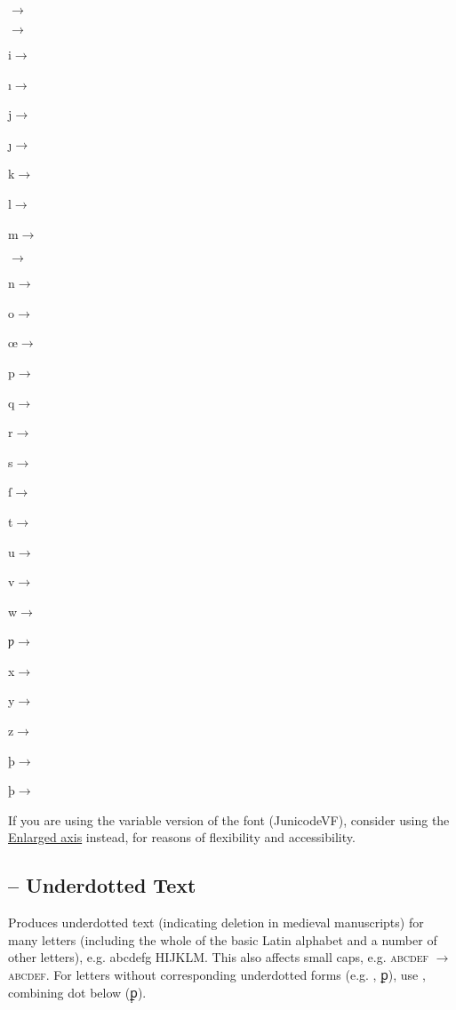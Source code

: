 \begin{multicols}{5}
$\rightarrow $

$\rightarrow $

i$\rightarrow $

ı$\rightarrow $

j$\rightarrow $

ȷ$\rightarrow $

k$\rightarrow $

l$\rightarrow $

m$\rightarrow $

$\rightarrow $

n$\rightarrow $

o$\rightarrow $

œ$\rightarrow $

p$\rightarrow $

q$\rightarrow $

r$\rightarrow $

s$\rightarrow $

ſ$\rightarrow $

t$\rightarrow $

u$\rightarrow $

v$\rightarrow $

w$\rightarrow $

ƿ$\rightarrow $

x$\rightarrow $

y$\rightarrow $

z$\rightarrow $

{þ$\rightarrow $}

þ$\rightarrow $
\end{multicols}

\noindent If you are using the variable version of the font (JunicodeVF), consider using the
\href{https://psb1558.github.io/Junicode-New/EnlargedAxis.html}{Enlarged axis} instead, for reasons of flexibility and
accessibility.

\subsection{ --
Underdotted Text}
Produces underdotted text (indicating deletion in medieval manuscripts) for many
letters (including
the whole of the basic Latin alphabet and a number of other letters), e.g.
{abcdefg HIJKLM}. This also affects small
caps, e.g. \textsc{abcdef} $\rightarrow $ {\textsc{abcdef}}.
For letters without corresponding underdotted forms (e.g. , ꝑ),
use , combining dot below (\hspace{0.05em}ꝑ̣).

